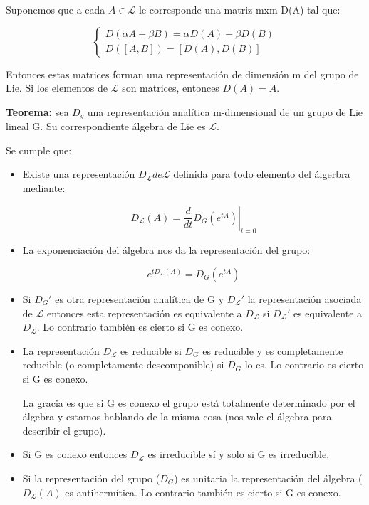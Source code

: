 Suponemos que a cada $A \in \mathcal{L}$ le corresponde una matriz mxm D(A) tal que:

$$\left \lbrace \begin{array}{c}
  D(\alpha A+\beta B)=\alpha D(A) + \beta D(B)  \\
  D([A,B])=[D(A),D(B)]
\end{array} \right .$$

Entonces estas matrices forman una representación de dimensión m del grupo de Lie. Si los elementos de $\mathcal{L}$ son matrices, entonces $D(A)=A$.

\smallskip
\textbf{Teorema:} sea $D_g$ una representación analítica m-dimensional de un grupo de Lie lineal G. Su correspondiente álgebra de Lie es $\mathcal{L}$.

Se cumple que:

\begin{itemize}
 \item Existe una representación $D_\mathcal{L} de \mathcal{L}$ definida para todo elemento del álgerbra mediante:

 $$D_\mathcal{L}(A)=\left .\frac{d}{dt}D_G(e^{tA})\right |_{t=0}$$

 \item La exponenciación del álgebra nos da la representación del grupo:

 $$e^{tD_\mathcal{L}(A)}=D_G(e^{tA})$$

 \item Si $D_G'$ es otra representación analítica de G y $D_\mathcal{L}'$ la representación asociada de $\mathcal{L}$ entonces esta representación es equivalente a $D_\mathcal{L}$ si $D_\mathcal{L}'$ es equivalente a $D_\mathcal{L}$. Lo contrario también es cierto si G es conexo.

 \item La representación $D_\mathcal{L}$ es reducible si $D_G$ es reducible y es completamente reducible (o completamente descomponible) si $D_G$ lo es. Lo contrario es cierto si G es conexo.

 La gracia es que si G es conexo el grupo está totalmente determinado por el álgebra y estamos hablando de la misma cosa (nos vale el álgebra para describir el grupo).

 \item Si G es conexo entonces $D_\mathcal{L}$ es irreducible sí y solo si G es irreducible.

 \item Si la representación del grupo ($D_G$) es unitaria la representación del álgebra ($D_\mathcal{L}(A)$ es antihermítica. Lo contrario también es cierto si G es conexo.
\end{itemize}



